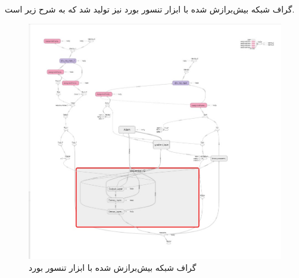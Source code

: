 \documentclass{article}
\begin{document}
گراف شبکه بیش‌برازش شده با ابزار تنسور بورد نیز تولید شد که به شرح زیر است.


\begin{figure}[!h]
    \centering\includegraphics[scale=.55]{./p7-6}
    \caption{گراف شبکه بیش‌برازش شده با ابزار تنسور بورد}\label{fig.76}
\end{figure}
\cleardoublepage








\end{document}
